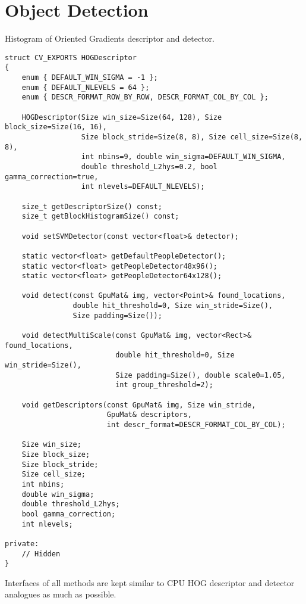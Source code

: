 \section{Object Detection}

Histogram of Oriented Gradients \cite{dalal_hog} descriptor and detector.

\begin{lstlisting}
struct CV_EXPORTS HOGDescriptor
{
    enum { DEFAULT_WIN_SIGMA = -1 };
    enum { DEFAULT_NLEVELS = 64 };
    enum { DESCR_FORMAT_ROW_BY_ROW, DESCR_FORMAT_COL_BY_COL };

    HOGDescriptor(Size win_size=Size(64, 128), Size block_size=Size(16, 16),
                  Size block_stride=Size(8, 8), Size cell_size=Size(8, 8),
                  int nbins=9, double win_sigma=DEFAULT_WIN_SIGMA,
                  double threshold_L2hys=0.2, bool gamma_correction=true,
                  int nlevels=DEFAULT_NLEVELS);

    size_t getDescriptorSize() const;
    size_t getBlockHistogramSize() const;

    void setSVMDetector(const vector<float>& detector);

    static vector<float> getDefaultPeopleDetector();
    static vector<float> getPeopleDetector48x96();
    static vector<float> getPeopleDetector64x128();

    void detect(const GpuMat& img, vector<Point>& found_locations, 
                double hit_threshold=0, Size win_stride=Size(), 
                Size padding=Size());

    void detectMultiScale(const GpuMat& img, vector<Rect>& found_locations,
                          double hit_threshold=0, Size win_stride=Size(), 
                          Size padding=Size(), double scale0=1.05, 
                          int group_threshold=2);

    void getDescriptors(const GpuMat& img, Size win_stride, 
                        GpuMat& descriptors,
                        int descr_format=DESCR_FORMAT_COL_BY_COL);

    Size win_size;
    Size block_size;
    Size block_stride;
    Size cell_size;
    int nbins;
    double win_sigma;
    double threshold_L2hys;
    bool gamma_correction;
    int nlevels;

private:
    // Hidden
}
\end{lstlisting}

Interfaces of all methods are kept similar to CPU HOG descriptor and detector analogues as much as possible.


